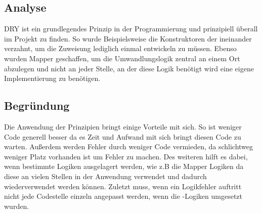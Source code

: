 		\subsection{Analyse}
		DRY ist ein grundlegendes Prinzip in der Programmierung und prinzipiell überall im Projekt zu finden. So wurde Beispielsweise die Konstruktoren der  ineinander verzahnt, um die Zuweisung lediglich einmal entwickeln zu müssen. Ebenso wurden Mapper geschaffen, um die Umwandlungslogik zentral an einem Ort abzulegen und nicht an jeder Stelle, an der diese Logik benötigt wird eine eigene Implementierung zu benötigen.
		
		\subsection{Begründung}
		Die Anwendung der  Prinzipien bringt einige Vorteile mit sich. So ist weniger Code generell besser da es Zeit und Aufwand mit sich bringt diesen Code zu warten. Außerdem werden Fehler durch weniger Code vermieden, da schlichtweg weniger Platz vorhanden ist um Fehler zu machen. Des weiteren hilft es dabei, wenn bestimmte Logiken ausgelagert werden, wie z.B die Mapper Logiken da diese an vielen Stellen in der Anwendung verwendet und dadurch wiederverwendet werden können. Zuletzt muss, wenn ein Logikfehler auftritt nicht jede Codestelle einzeln angepasst werden, wenn die -Logiken umgesetzt wurden.